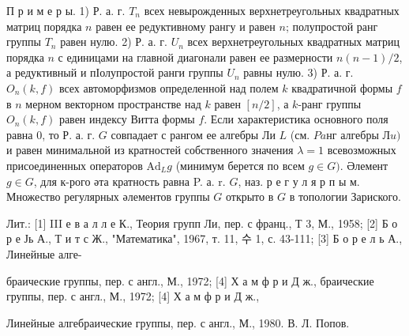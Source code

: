 \documentclass[10pt]{article}
\begin{document}
П р и м е р ы. 1) Р. а. г. $T_{n}$ всех невырожденных верхнетреугольных квадратных матриц порядка $n$ равен ее редуктивному рангу и равен $n$; полупростой ранг группы $T_{n}$ равен нулю. 2) Р. а. г. $U_{n}$ всех верхнетреугольных квадратных матриц порядка $n$ с единицами на главной диагонали равен ее размерности $n(n-1) / 2$, а редуктивный и пІолупростой ранги группы $U_{n}$ равны нулю. 3) Р. а. г. $O_{n}(k, f)$ всех автоморфизмов определенной над полем $k$ квадратичной формы $f$ в $n$ мерном векторном пространстве над $k$ равен $[n / 2]$, а $k$-ранг группы $O_{n}(k, f)$ равен индексу Витта формы $f$. Если характеристика основного поля равна 0, то Р. а. г. $G$ совпадает с рангом ее алгебры Ли $L$ (см. $P a н г$ алгебры $Л u)$ и равен минимальной из кратностей собственного значения $\lambda=1$ всевозможных присоединенных операторов $\mathrm{Ad}_{L} g$ (минимум берется по всем $g \in G)$. Әлемент $g \in G$, для к-рого әта кратность равна P. а. r. $G$, наз. р е г у л я р п ы м. Множество регулярных әлементов группы $G$ открыто в $G$ в топологии Зариского.



Лит.: [1] III е в а л л е К., Теория групп Ли, пер. с франц., Т 3, М., 1958; [2] Б о р е Јь А., Т и т с Ж., "Математика", 1967, т. 11, 수 1, с. 43-111; [3] Б о р е л ь А., Линейные алге-

браические группы, пер. с англ., М., 1972; [4] Х а м ф р и Д ж., браические группы, пер. с англ., М., 1972; [4] Х а м ф р и Д ж.,

Линейные алгебраические группы, пер. с англ., М., 1980. В. Л. Попов.
\end{document}
